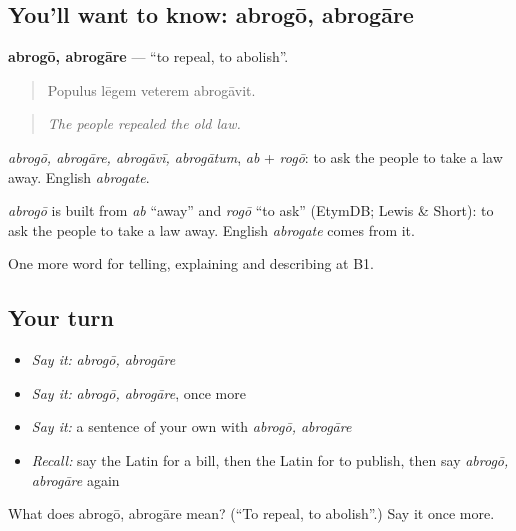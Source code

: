 \subsection*{You'll want to know: abrogō, abrogāre}
\textbf{abrogō, abrogāre} — \textquotedblleft{}to repeal, to abolish\textquotedblright{}.

\begin{quote}
Populus lēgem veterem abrogāvit.
\end{quote}

\begin{quote}
\emph{The people repealed the old law.}
\end{quote}

\emph{abrogō, abrogāre, abrogāvī, abrogātum}, \emph{ab} + \emph{rogō}: to ask the people to take a law away. English \emph{abrogate}.

\begin{cousinweb}
\emph{abrogō} is built from \emph{ab} \textquotedblleft{}away\textquotedblright{} and \emph{rogō} \textquotedblleft{}to ask\textquotedblright{} (EtymDB; Lewis \& Short): to ask the people to take a law away. English \emph{abrogate} comes from it.
\end{cousinweb}

\begin{grammarlens}[title={What you've built}]
One more word for telling, explaining and describing at B1.
\end{grammarlens}

\subsection*{Your turn}
\begin{itemize}
\raggedright
  \item \emph{Say it:} \emph{abrogō, abrogāre}
  \item \emph{Say it:} \emph{abrogō, abrogāre}, once more
  \item \emph{Say it:} a sentence of your own with \emph{abrogō, abrogāre}
  \item \emph{Recall:} say the Latin for a bill, then the Latin for to publish, then say \emph{abrogō, abrogāre} again
\end{itemize}

\begin{tcolorbox}[breakable,colback=teal!4,colframe=teal!35!black,title={Before you move on}]
What does abrogō, abrogāre mean? (\textquotedblleft{}To repeal, to abolish\textquotedblright{}.) Say it once more.
\end{tcolorbox}
